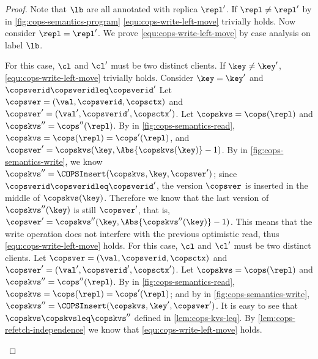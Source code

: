 \begin{toappendix}
\begin{proof}
Note that \( \lb \) are all annotated with replica \( \repl' \).
If \(\repl \neq \repl' \) 
by \rCOPSClient in \cref{fig:cops-semantics-program} \cref{equ:cops-write-left-move} trivially holds.
Now consider \( \repl = \repl' \).
We prove \cref{equ:cops-write-left-move} by case analysis on label \( \lb \).
\begin{enumerate}
    For this case, \( \cl \) and \( \cl' \) must be two distinct clients.
    If \( \key \neq \key' \), \cref{equ:cops-write-left-move} trivially holds.
    Consider \( \key = \key' \) and \( \copsverid \copsveridleq \copsverid' \) 
    Let \( \copsver = (\val,\copsverid, \copsctx ) \) and \( \copsver' = (\val',\copsverid', \copsctx' ) \).
    Let \( \copskvs = \cops(\repl) \) and \( \copskvs'' = \cops''(\repl) \).
    By \rCOPSOptRead in \cref{fig:cops-semantics-read}, \( \copskvs = \cops(\repl) = \cops'(\repl) \),
    and \( \copsver' = \copskvs(\key, \Abs{\copskvs(\key)} - 1 )\).
    By \rCOPSWrite in \cref{fig:cops-semantics-write}, we know \( \copskvs'' = \COPSInsert(\copskvs,\key,\copsver' ) \);
    since \( \copsverid \copsveridleq \copsverid' \), the version \( \copsver \)
    is inserted in the middle of \( \copskvs(\key) \).
    Therefore we know that the last version of \( \copskvs''(\key) \) is still \( \copsver' \),
    that is, \( \copsver' = \copskvs''(\key, \Abs{\copskvs''(\key)} - 1 ) \).
    This means that the write operation does not interfere with the previous optimistic read,
    thus \cref{equ:cops-write-left-move} holds.
    For this case, \( \cl \) and \( \cl' \) must be two distinct clients.
    Let \( \copsver = (\val,\copsverid, \copsctx ) \) and \( \copsver' = (\val',\copsverid', \copsctx' ) \).
    Let \( \copskvs = \cops(\repl) \) and \( \copskvs'' = \cops''(\repl) \).
    By \rCOPSRefetch in \cref{fig:cops-semantics-read}, \( \copskvs = \cops(\repl) = \cops'(\repl) \); 
    and by \rCOPSWrite in \cref{fig:cops-semantics-write}, \( \copskvs'' = \COPSInsert(\copskvs,\key',\copsver' ) \).
    It is easy to see that \( \copskvs \copskvsleq \copskvs'' \) defined in \cref{lem:cops-kvs-leq}.
    By \cref{lem:cops-refetch-independence} we know that \cref{equ:cops-write-left-move} holds.

\end{enumerate}
\end{proof}
\end{toappendix}
